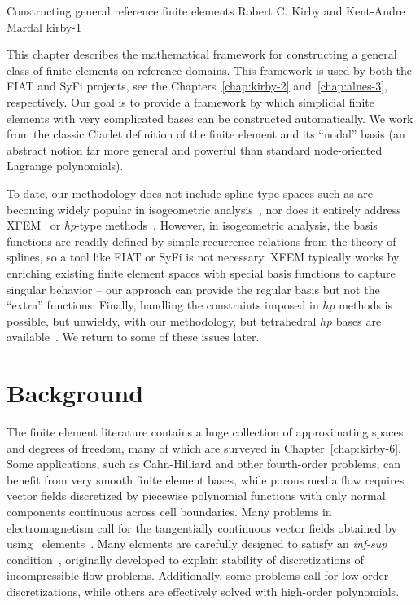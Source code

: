 \newcommand{\mathbfx}[1]{{\mbox{\boldmath $#1$}}}
\renewcommand{\H}{{\mathcal{H}}}
\newcommand{\GG}{\mathbf{G}}

              {Constructing general reference finite elements}
              {Robert C. Kirby and Kent-Andre Mardal}
              {kirby-1}

This chapter describes the mathematical framework for constructing a
general class of finite elements on reference domains. This framework is used
by both the FIAT and SyFi projects, see the Chapters~\ref{chap:kirby-2}
and~\ref{chap:alnes-3}, respectively.  Our goal is to provide a framework
by which simplicial finite elements with very complicated bases can be
constructed automatically.  We work from the classic Ciarlet definition
of the finite element and its ``nodal'' basis (an abstract notion far more
general and powerful than standard node-oriented Lagrange polynomials).

To date, our methodology does not include spline-type
spaces such as are becoming widely popular in isogeometric
analysis~\citep{HughesCottrellBazilevs2005}, nor does it entirely
address XFEM~\citep{ChessaSmolinskiBelytschko2002} or {\em hp}-type
methods~\citep{Schwab1998}.  However, in isogeometric analysis, the
basis functions are readily defined by simple recurrence relations
from the theory of splines, so a tool like FIAT or SyFi is not
necessary.  XFEM typically works by enriching existing finite element
spaces with special basis functions to capture singular behavior -- our
approach can provide the regular basis but not the ``extra'' functions.
Finally, handling the constraints imposed in $hp$ methods is possible,
but unwieldy, with our methodology, but tetrahedral $hp$ bases are
available~\citep{AinsworthCoyle2003}.  We return to some of these
issues later.

\section{Background}
The finite element literature contains a huge collection of
approximating spaces and degrees of freedom, many of which are
surveyed in Chapter~\ref{chap:kirby-6}.  Some applications, such
as Cahn-Hilliard and other fourth-order problems, can benefit from
very smooth finite element bases, while porous media flow requires
vector fields discretized by piecewise polynomial functions with only
normal components continuous across cell boundaries.  Many problems
in electromagnetism call for the tangentially continuous vector fields
obtained by using \nedelec\ elements~\citep{Nedelec1980,Nedelec1986}.
Many elements are carefully designed to satisfy an \emph{inf-sup}
condition~\citep{BrezziFortin1991,GiraultRaviart1986}, originally
developed to explain stability of discretizations of incompressible flow
problems.  Additionally, some problems call for low-order discretizations,
while others are effectively solved with high-order polynomials.

